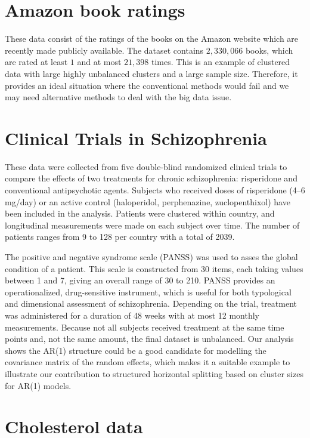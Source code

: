 \documentclass[11pt,a5paper,twoside]{book}
\begin{document}
\section{Amazon book ratings} 
\label{mot_amazon}
These data consist of the ratings of the books on the Amazon website which are recently made publicly available. The dataset contains $2,330,066$ books, which are rated at least $1$ and at most $21,398$ times. This is an example of clustered data with large highly unbalanced clusters and a large sample size. Therefore, it provides an ideal situation where the conventional methods would fail and we may need alternative methods to deal with the big data issue.

\section{Clinical Trials in Schizophrenia} 

These data were collected from five double-blind randomized clinical trials to compare the effects of two treatments for chronic schizophrenia: risperidone and conventional antipsychotic agents. Subjects who received doses of risperidone (4–6 mg/day) or an active control (haloperidol, perphenazine, zuclopenthixol) have been included in the analysis. Patients were clustered within country, and longitudinal measurements were made on each subject over time. The number of patients ranges from 9 to 128 per country with a total of 2039. 

The positive and negative syndrome scale (PANSS) was used to asses the global condition of a patient. This scale is constructed from 30 items, each taking values between 1 and 7, giving an overall range of 30 to 210. PANSS provides an operationalized, drug-sensitive instrument, which is useful for both typological and dimensional assessment of schizophrenia. Depending on the trial, treatment was administered for a duration of 48 weeks with at most 12 monthly measurements. Because not all subjects received treatment at the same time points and, not the same amount, the final dataset is unbalanced. Our analysis shows the AR(1) structure could be a good candidate for modelling the covariance matrix of the random effects, which makes it a suitable example to illustrate our contribution to structured horizontal splitting based on cluster sizes for AR(1) models.

\section{Cholesterol data}
\end{document}
